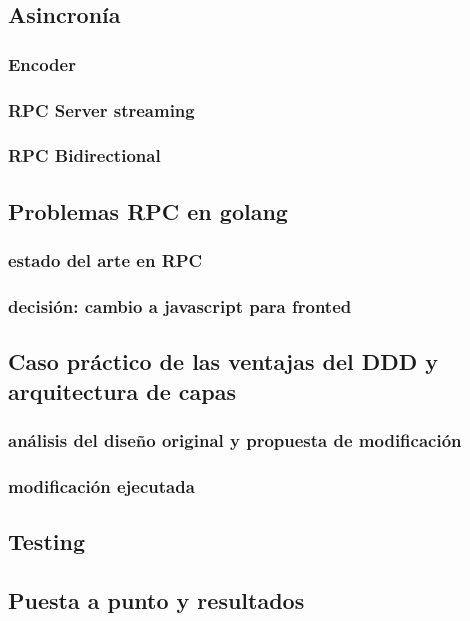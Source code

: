 \subsection{Asincronía}\label{subsec:asincronia}

\subsubsection{Encoder}
    \subsubsection{RPC Server streaming}
    \subsubsection{RPC Bidirectional}
\subsection{Problemas RPC en golang}\label{subsec:problemas-rpc-en-golang}

\subsubsection{estado del arte en RPC}
    \subsubsection{decisión: cambio a javascript para fronted}
\subsection{Caso práctico de las ventajas del DDD y arquitectura de capas}
    \subsubsection{análisis del diseño original y propuesta de modificación}
    \subsubsection{modificación ejecutada}
\subsection{Testing}
\subsection{Puesta a punto y resultados}